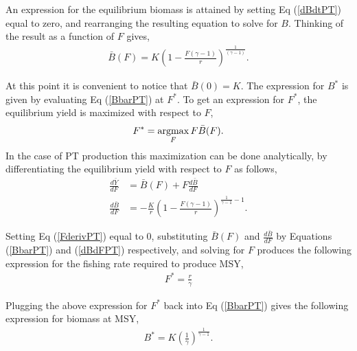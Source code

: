 An expression for the equilibrium biomass is attained by setting Eq (\ref{dBdtPT})
equal to zero, and rearranging the resulting equation to solve for $B$.
Thinking of the result as a function of $F$ gives,
\begin{align}
\bar B(F) = K\left(1-\frac{F(\gamma-1)}{r}\right)^{\frac{1}{(\gamma-1)}}. \label{BbarPT}
\end{align}

At this point it is convenient to notice that $\bar B(0)=K$. The expression for
$B^*$ is given by evaluating Eq (\ref{BbarPT}) at $F^*$.
%
To get an expression for $F^*$, the equilibrium yield is maximized with respect to $F$,
\begin{equation}
F^* = \argmax_F F\bar B(F).
\end{equation}
%
In the case of PT production this maximization can be done analytically, %
by differentiating the equilibrium yield with respect to $F$ as follows,
%
\begin{align}
\frac{d \bar{Y}}{dF} &= \bar B(F) + F \frac{d \bar B}{dF} \label{FderivPT}\\
\frac{d \bar B}{dF} &= -\frac{K}{r}\left(1-\frac{F(\gamma-1)}{r}\right)^{\frac{1}{\gamma-1}-1}\label{dBdFPT}.
\end{align}

Setting Eq (\ref{FderivPT}) equal to 0, substituting $\bar B(F)$ and
$\frac{d \bar B}{dF}$ by Equations (\ref{BbarPT}) and (\ref{dBdFPT}) respectively,
and solving for $F$ produces the following expression for the fishing
rate required to produce MSY, %
%
\begin{align}
F^* = \frac{r}{\gamma}%
\end{align}

%
Plugging the above expression for $F^*$ back into Eq (\ref{BbarPT}) gives the
following expression for biomass at MSY,
\begin{align}
B^* = K\left(\frac{1}{\gamma}\right)^{\frac{1}{\gamma-1}} \label{BmsyPT}. %
\end{align}

